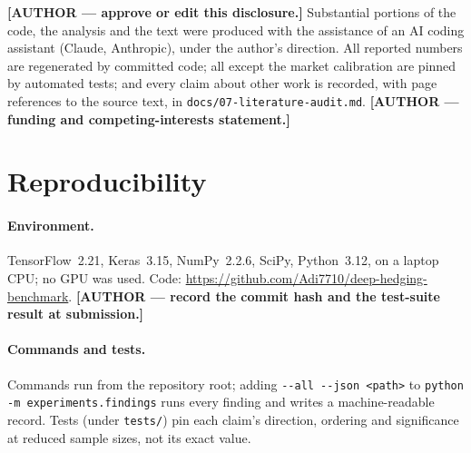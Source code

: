 \documentclass{article}
\begin{document}
\begin{ack}
\textbf{[AUTHOR --- approve or edit this disclosure.]} Substantial portions of the code, the
analysis and the text were produced with the assistance of an AI coding assistant (Claude,
Anthropic), under the author's direction. All reported numbers are regenerated by committed code;
all except the market calibration are pinned by automated tests; and every claim about other work
is recorded, with page references to the source text, in \texttt{docs/07-literature-audit.md}.
\textbf{[AUTHOR --- funding and competing-interests statement.]}
\end{ack}

{\small


}

\appendix

\section{Reproducibility}\label{app:repro}

\paragraph{Environment.} TensorFlow~2.21, Keras~3.15, NumPy~2.2.6, SciPy, Python~3.12, on a laptop
CPU; no GPU was used. Code: \url{https://github.com/Adi7710/deep-hedging-benchmark}.
\textbf{[AUTHOR --- record the commit hash and the test-suite result at submission.]}

\paragraph{Commands and tests.} Commands run from the repository root; adding
\texttt{-{}-all -{}-json <path>} to \texttt{python -m experiments.findings} runs every finding
and writes a machine-readable record. Tests (under \texttt{tests/}) pin each claim's direction,
ordering and significance at reduced sample sizes, not its exact value.
\end{document}
